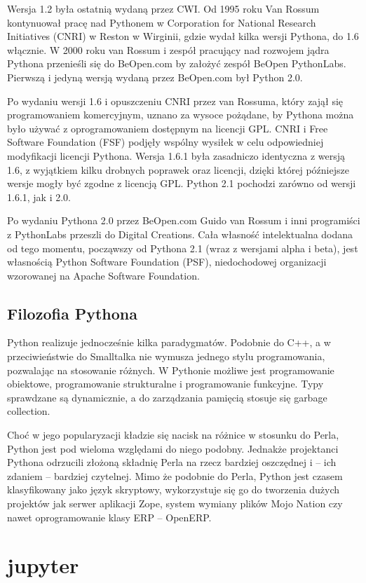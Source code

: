 \documentclass{article}
\begin{document}
Wersja 1.2 była ostatnią wydaną przez CWI. Od 1995 roku Van Rossum kontynuował pracę nad Pythonem w Corporation for National Research Initiatives (CNRI) w Reston w Wirginii, gdzie wydał kilka wersji Pythona, do 1.6 włącznie. W 2000 roku van Rossum i zespół pracujący nad rozwojem jądra Pythona przenieśli się do BeOpen.com by założyć zespół BeOpen PythonLabs. Pierwszą i jedyną wersją wydaną przez BeOpen.com był Python 2.0.

Po wydaniu wersji 1.6 i opuszczeniu CNRI przez van Rossuma, który zajął się programowaniem komercyjnym, uznano za wysoce pożądane, by Pythona można było używać z oprogramowaniem dostępnym na licencji GPL. CNRI i Free Software Foundation (FSF) podjęły wspólny wysiłek w celu odpowiedniej modyfikacji licencji Pythona. Wersja 1.6.1 była zasadniczo identyczna z wersją 1.6, z wyjątkiem kilku drobnych poprawek oraz licencji, dzięki której późniejsze wersje mogły być zgodne z licencją GPL. Python 2.1 pochodzi zarówno od wersji 1.6.1, jak i 2.0.

Po wydaniu Pythona 2.0 przez BeOpen.com Guido van Rossum i inni programiści z PythonLabs przeszli do Digital Creations. Cała własność intelektualna dodana od tego momentu, począwszy od Pythona 2.1 (wraz z wersjami alpha i beta), jest własnością Python Software Foundation (PSF), niedochodowej organizacji wzorowanej na Apache Software Foundation.
 \subsection{Filozofia Pythona} 
 Python realizuje jednocześnie kilka paradygmatów. Podobnie do C++, a w przeciwieństwie do Smalltalka nie wymusza jednego stylu programowania, pozwalając na stosowanie różnych. W Pythonie możliwe jest programowanie obiektowe, programowanie strukturalne i programowanie funkcyjne. Typy sprawdzane są dynamicznie, a do zarządzania pamięcią stosuje się garbage collection.

Choć w jego popularyzacji kładzie się nacisk na różnice w stosunku do Perla, Python jest pod wieloma względami do niego podobny. Jednakże projektanci Pythona odrzucili złożoną składnię Perla na rzecz bardziej oszczędnej i – ich zdaniem – bardziej czytelnej. Mimo że podobnie do Perla, Python jest czasem klasyfikowany jako język skryptowy, wykorzystuje się go do tworzenia dużych projektów jak serwer aplikacji Zope, system wymiany plików Mojo Nation czy nawet oprogramowanie klasy ERP – OpenERP.
 \newpage
\section{jupyter}
\end{document}
